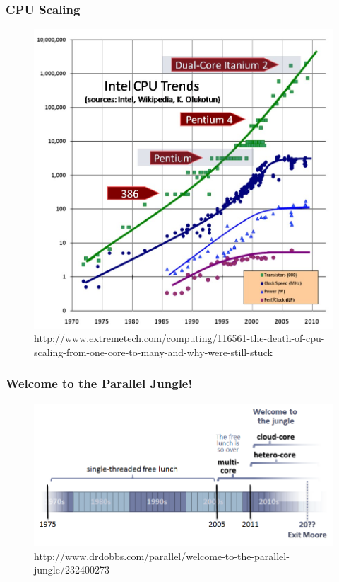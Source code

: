\documentclass[12pt]{beamer}
\begin{document}
\begin{frame}
\frametitle{CPU Scaling}
\begin{figure}
\includegraphics[height=0.7\textheight]{img/cpuscaling.jpg}
\caption{http://www.extremetech.com/computing/116561-the-death-of-cpu-scaling-from-one-core-to-many-and-why-were-still-stuck}
\end{figure}
\end{frame}

\begin{frame}
\frametitle{Welcome to the Parallel Jungle!}
\begin{figure}
\includegraphics[width=\textwidth]{img/sutter.png}
\caption{http://www.drdobbs.com/parallel/welcome-to-the-parallel-jungle/232400273}
\end{figure}
\end{frame}
\end{document}
